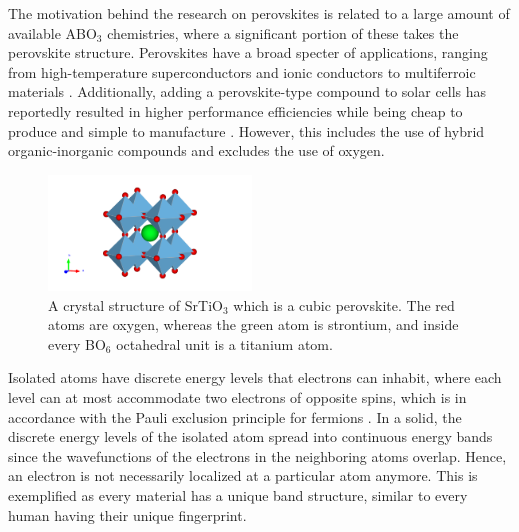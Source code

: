 The motivation behind the research on perovskites is related to a large amount of available ABO$_3$ chemistries, where a significant portion of these takes the perovskite structure. Perovskites have a broad specter of applications, ranging from high-temperature superconductors \cite{Bednorz1988} and ionic conductors \cite{Boivin1998} to multiferroic materials \cite{Cheong2007}. Additionally, adding a perovskite-type compound to solar cells has reportedly resulted in higher performance efficiencies while being cheap to produce and simple to manufacture \cite{IbnMohammed2017, Chen2014}. However, this includes the use of hybrid organic-inorganic compounds and excludes the use of oxygen.


\begin{figure}
  \centering
  \includegraphics[width=0.48\textwidth]{theory/figures/SrTiO3_mp-5229_primitive.pdf}
  \caption{A crystal structure of SrTiO$_3$ which is a cubic perovskite. The red atoms are oxygen, whereas the green atom is strontium, and inside every BO$_6$ octahedral unit is a titanium atom.}
  \label{fig:perovskite}
\end{figure}

Isolated atoms have discrete energy levels that electrons can inhabit, where each level can at most accommodate two electrons of opposite spins, which is in accordance with the Pauli exclusion principle for fermions \cite{Pauli1925}. %
In a solid, the discrete energy levels of the isolated atom spread into continuous energy bands since the wavefunctions of the electrons in the neighboring atoms overlap. Hence, an electron is not necessarily localized at a particular atom anymore. This is exemplified as every material has a unique band structure, similar to every human having their unique fingerprint.

